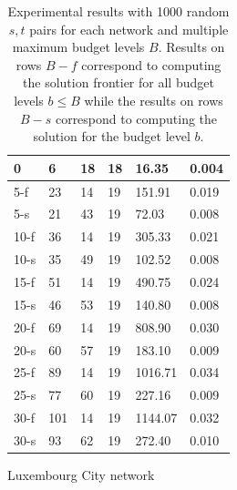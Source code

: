 \begin{table}
\begin{subtable}{.5\textwidth}
\begin{center}
\begin{tabular}{ | l | p{1cm} | p{1cm} | p{1cm} | p{1.2cm} | p{1.2cm} |}
	0 & 6 & 18 & 18 & 16.35 & 0.004 \\ \hline
	5-f & 23 & 14& 19 & 151.91 & 0.019 \\ 
	5-s & 21 & 43 &19 & 72.03 & 0.008 \\ \hline
	10-f & 36 & 14 & 19 & 305.33 & 0.021 \\ 
	10-s & 35 & 49 & 19 & 102.52 & 0.008 \\ \hline
	15-f & 51 & 14& 19 & 490.75 & 0.024 \\ 
	15-s & 46 & 53 & 19 & 140.80 & 0.008 \\ \hline
	20-f & 69 & 14 & 19 & 808.90 & 0.030 \\ 
	20-s & 60 & 57 & 19 & 183.10 & 0.009 \\ \hline
	25-f & 89 & 14 & 19 & 1016.71 & 0.034 \\ 
	25-s & 77 & 60 & 19 & 227.16 & 0.009 \\ \hline
	30-f & 101 & 14& 19 & 1144.07 & 0.032 \\ 
	30-s & 93 & 62 & 19 & 272.40 & 0.010 \\ \hline
\end{tabular}
\caption{Luxembourg City network}\label{tab:lu4k_results}
\end{center}
\end{subtable}
\caption{Experimental results with 1000 random $s,t$ pairs for each network and multiple maximum budget levels $B$. Results on rows $B-f$ correspond to computing the solution frontier for all budget levels $b\leq B$ while the results on rows $B-s$ correspond to computing the solution for the budget level $b$.}\label{tab:performance_results}
\end{table}

